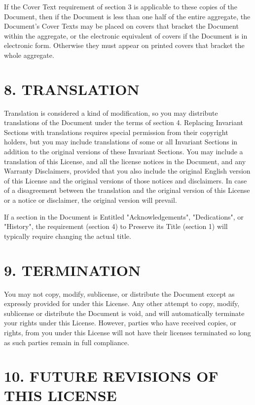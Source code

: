 \documentclass{book}
\begin{document}
If the Cover Text requirement of section 3 is applicable to these
copies of the Document, then if the Document is less than one half of
the entire aggregate, the Document's Cover Texts may be placed on
covers that bracket the Document within the aggregate, or the
electronic equivalent of covers if the Document is in electronic form.
Otherwise they must appear on printed covers that bracket the whole
aggregate.

\section*{8. TRANSLATION}

Translation is considered a kind of modification, so you may
distribute translations of the Document under the terms of section 4.
Replacing Invariant Sections with translations requires special
permission from their copyright holders, but you may include
translations of some or all Invariant Sections in addition to the
original versions of these Invariant Sections. You may include a
translation of this License, and all the license notices in the
Document, and any Warranty Disclaimers, provided that you also include
the original English version of this License and the original versions
of those notices and disclaimers. In case of a disagreement between
the translation and the original version of this License or a notice
or disclaimer, the original version will prevail.

If a section in the Document is Entitled "Acknowledgements",
"Dedications", or "History", the requirement (section 4) to Preserve
its Title (section 1) will typically require changing the actual
title.

\section*{9. TERMINATION}

You may not copy, modify, sublicense, or distribute the Document
except as expressly provided for under this License. Any other attempt
to copy, modify, sublicense or distribute the Document is void, and
will automatically terminate your rights under this License. However,
parties who have received copies, or rights, from you under this
License will not have their licenses terminated so long as such
parties remain in full compliance.

\section*{10. FUTURE REVISIONS OF THIS LICENSE}
\end{document}
